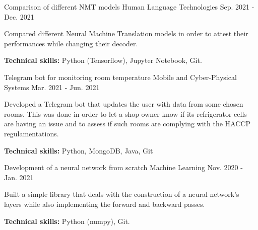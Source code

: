 \begin{cventries}
\cventry
{Comparison of different NMT models} %
{Human Language Technologies} %
{} %
{Sep. 2021 - Dec. 2021} %
{
    \begin{cvitems}
        \item{Compared different Neural Machine Translation models in order to attest their performances while changing their decoder.}
        \item{\textbf{Technical skills:} Python (Tensorflow), Jupyter Notebook, Git.} 
    \end{cvitems}
}

\cventry
{Telegram bot for monitoring room temperature} %
{Mobile and Cyber-Physical Systems} %
{} %
{Mar. 2021 - Jun. 2021} %
{
    \begin{cvitems}
        \item{Developed a Telegram bot that updates the user with data from some chosen rooms. This was done in order to let a shop owner know if its refrigerator cells are having an issue and to assess if such rooms are complying with the HACCP regulamentations.}
        \item{\textbf{Technical skills:} Python, MongoDB, Java, Git}
    \end{cvitems}
}

\cventry
{Development of a neural network from scratch} %
{Machine Learning} %
{} %
{Nov. 2020 - Jan. 2021} %
{
    \begin{cvitems}
        \item{Built a simple library that deals with the construction of a neural network's layers while also implementing the forward and backward passes.}
        \item{\textbf{Technical skills:} Python (numpy), Git.}
    \end{cvitems}
}

\end{cventries}
